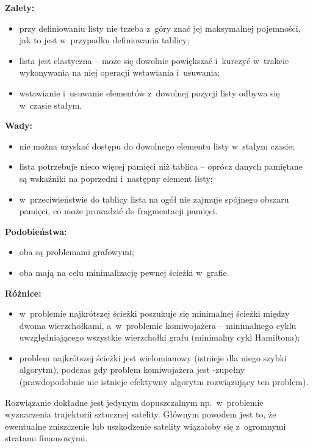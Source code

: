 \bigskip
\noindent\textbf{Zalety:}
\begin{itemize}
	\item przy definiowaniu listy nie trzeba z~góry znać jej maksymalnej pojemności, jak to jest w~przypadku definiowania tablicy;
	\item lista jest elastyczna -- może się dowolnie powiększać i~kurczyć w~trakcie wykonywania na niej operacji wstawiania i~usuwania;
	\item wstawianie i~usuwanie elementów z~dowolnej pozycji listy odbywa się w~czasie stałym.
\end{itemize}
\bigskip
\noindent\textbf{Wady:}
\begin{itemize}
	\item nie można uzyskać dostępu do dowolnego elementu listy w~stałym czasie;
	\item lista potrzebuje nieco więcej pamięci niż tablica -- oprócz danych pamiętane są wskaźniki na poprzedni i~następny element listy;
	\item w~przeciwieństwie do tablicy lista na ogół nie zajmuje spójnego obszaru pamięci, co może prowadzić do fragmentacji pamięci.
\end{itemize}

\exercise %
\noindent\textbf{Podobieństwa:}
\begin{itemize}
	\item oba są problemami grafowymi;
	\item oba mają na celu minimalizację pewnej ścieżki w~grafie.
\end{itemize}
\bigskip
\noindent\textbf{Różnice:}
\begin{itemize}
	\item w~problemie najkrótszej ścieżki poszukuje się minimalnej ścieżki między dwoma wierzchołkami, a~w~problemie komiwojażera -- minimalnego cyklu uwzględniającego wszystkie wierzchołki grafu (minimalny cykl Hamiltona);
	\item problem najkrótszej ścieżki jest wielomianowy (istnieje dla niego szybki algorytm), podczas gdy problem komiwojażera jest \NPclass-zupełny (prawdopodobnie nie istnieje efektywny algorytm rozwiązujący ten problem).
\end{itemize}

\exercise %
Rozwiązanie dokładne jest jedynym dopuszczalnym np.\ w~problemie wyznaczenia trajektorii sztucznej satelity. Głównym powodem jest to, że ewentualne zniszczenie lub uszkodzenie satelity wiązałoby się z~ogromnymi stratami finansowymi.


